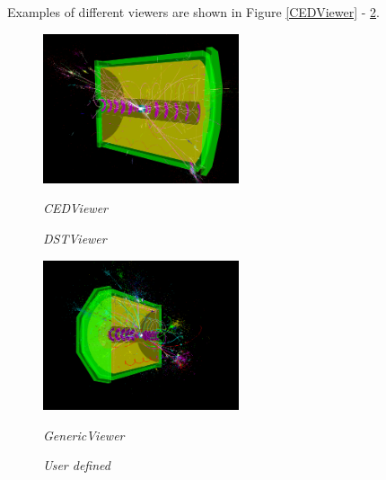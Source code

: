 \documentclass[a4paper,10pt]{article}
\begin{document}
Examples of different viewers are shown in Figure \ref{CEDViewer} - \ref{User viewer}. 

\begin{figure}[h]
\begin{minipage}[t]{6cm}
\setlength{\fboxsep}{0mm}
\centerline{\includegraphics[height=4.4cm]{ced_viewer1.png}}
\caption{\label{CEDViewer} \textsl{CEDViewer}}
\end{minipage}
\hfill
\begin{minipage}[t]{6cm}
\setlength{\fboxsep}{0mm}
\centerline{}
\caption{\label{DSTViewer}\textsl{DSTViewer}}
\end{minipage}
\end{figure}

\begin{figure}[h]
\begin{minipage}[t]{6cm}
\setlength{\fboxsep}{0mm}
\centerline{\includegraphics[height=4.4cm]{generic_viewer1.png}}
\caption{\label{GenericViewer} \textsl{GenericViewer}}
\end{minipage}
\hfill
\begin{minipage}[t]{6cm}
\setlength{\fboxsep}{0mm}
\centerline{}
\caption{\label{User viewer}\textsl{User defined}}
\end{minipage}
\end{figure}
\end{document}
